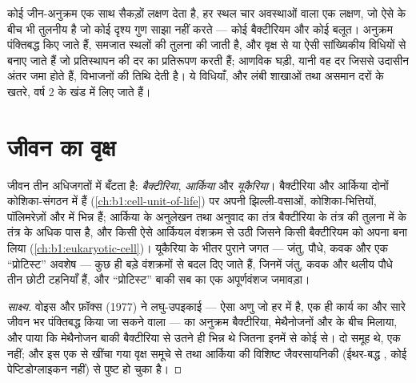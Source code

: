 \begin{remark}[आणविक लक्षण]\label{rem:b1:classifying-biodiversity:molecular}
कोई जीन-अनुक्रम एक साथ सैकड़ों लक्षण देता है, हर स्थल चार अवस्थाओं वाला
एक लक्षण, जो ऐसे  के बीच भी तुलनीय है जो कोई दृश्य गुण साझा नहीं
करते --- कोई बैक्टीरियम और कोई बलूत। अनुक्रम पंक्तिबद्ध किए जाते हैं,
समजात स्थलों की तुलना की जाती है, और वृक्ष  से या ऐसी
सांख्यिकीय विधियों से बनाए जाते हैं जो प्रतिस्थापन की दर का प्रतिरूपण
करती हैं; आणविक घड़ी, यानी वह दर जिससे उदासीन अंतर जमा होते हैं, विभाजनों
की तिथि देती है। ये विधियाँ, और लंबी शाखाओं तथा असमान दरों के खतरे,
वर्ष 2 के खंड में लिए जाते हैं।
\end{remark}

\section{जीवन का वृक्ष}

\begin{proposition}[तीन अधिजगत]\label{prop:b1:classifying-biodiversity:domains}
जीवन तीन अधिजगतों में बँटता है: \emph{बैक्टीरिया}, \emph{आर्किया} और
\emph{यूकैरिया}। बैक्टीरिया और आर्किया दोनों कोशिका-संगठन में
 हैं (\cref{ch:b1:cell-unit-of-life}) पर अपनी
झिल्ली-वसाओं, कोशिका-भित्तियों,  पॉलिमरेज़ों और  में भिन्न
हैं; आर्किया के अनुलेखन तथा अनुवाद का तंत्र बैक्टीरिया के तंत्र की
तुलना में  के तंत्र के अधिक पास है, और 
किसी ऐसे आर्कियल वंशक्रम से उठी जिसने किसी बैक्टीरियम को अपना
 बना लिया (\cref{ch:b1:eukaryotic-cell})। यूकैरिया के भीतर
पुराने जगत --- जंतु, पौधे, कवक और एक ``प्रोटिस्ट'' अवशेष ---
कुछ ही बड़े वंशक्रमों से बदल दिए जाते हैं, जिनमें जंतु, कवक और थलीय पौधे
तीन छोटी टहनियाँ हैं, और ``प्रोटिस्ट'' बाकी सब का एक अपूर्णवंशज जमावड़ा।
\end{proposition}
\begin{proof}[साक्ष्य]
वोइस और फ़ॉक्स (1977) ने लघु-उपइकाई  --- ऐसा अणु जो हर
 में है, एक ही कार्य का और सारे जीवन भर पंक्तिबद्ध किया जा सकने
वाला --- का अनुक्रम बैक्टीरिया, मेथैनोजनों और  के बीच
मिलाया, और पाया कि मेथैनोजन बाकी बैक्टीरिया से उतने ही भिन्न थे जितना
इनमें से कोई  से।  दो समूह थे, एक नहीं; और इस
एक  से खींचा गया वृक्ष समूचे  से तथा आर्किया की विशिष्ट
जैवरसायनिकी (ईथर-बद्ध , कोई पेप्टिडोग्लाइकन नहीं) से पुष्ट हो चुका
है।
\end{proof}

